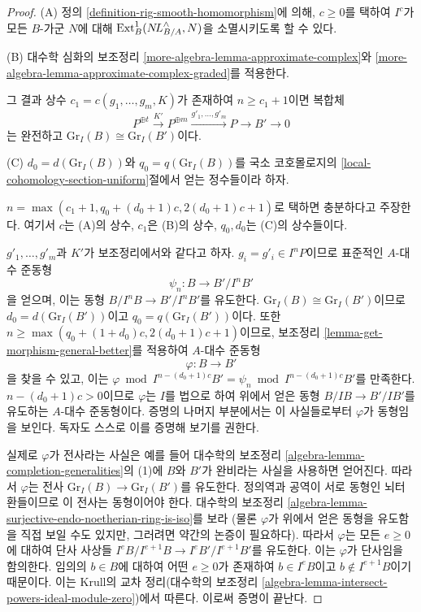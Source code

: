 \begin{proof}
(A) 정의 \ref{definition-rig-smooth-homomorphism}에 의해,
$c \geq 0$를 택하여 $I^c$가 모든 $B$-가군 $N$에 대해
$\mathop{\mathrm{Ext}}\nolimits^1_B(\mathop{N\!L}\nolimits_{B/A}^\wedge, N)$을 소멸시키도록 할 수 있다.

\medskip\noindent
(B) 대수학 심화의 보조정리
\ref{more-algebra-lemma-approximate-complex}와
\ref{more-algebra-lemma-approximate-complex-graded}를 적용한다.

\noindent
그 결과 상수 $c_1 = c(g_1, \ldots, g_m, K)$가 존재하여
$n \geq c_1 + 1$이면 복합체
$$
P^{\oplus t} \xrightarrow{K'} P^{\oplus m}
\xrightarrow{g'_1, \ldots, g'_m} P \to B' \to 0
$$
는 완전하고 $\text{Gr}_I(B) \cong \text{Gr}_I(B')$이다.

\medskip\noindent
(C) $d_0 = d(\text{Gr}_I(B))$와 $q_0 = q(\text{Gr}_I(B))$를
국소 코호몰로지의 \ref{local-cohomology-section-uniform}절에서 얻는 정수들이라 하자.

\medskip\noindent
$n = \max(c_1 + 1, q_0 + (d_0 + 1)c, 2(d_0 + 1)c + 1)$로 택하면 충분하다고 주장한다.
여기서 $c$는 (A)의 상수, $c_1$은 (B)의 상수, $q_0, d_0$는 (C)의 상수들이다.

\medskip\noindent
$g'_1, \ldots, g'_m$과 $K'$가 보조정리에서와 같다고 하자.
$g_i = g'_i \in I^nP$이므로 표준적인 $A$-대수 준동형
$$
\psi_n : B \longrightarrow B'/I^nB'
$$
을 얻으며, 이는 동형 $B/I^nB \to B'/I^nB'$를 유도한다.
$\text{Gr}_I(B) \cong \text{Gr}_I(B')$이므로
$d_0 = d(\text{Gr}_I(B'))$이고 $q_0 = q(\text{Gr}_I(B'))$이다.
또한 $n \geq \max(q_0 + (1 + d_0)c, 2(d_0 + 1)c + 1)$이므로,
보조정리 \ref{lemma-get-morphism-general-better}를 적용하여 $A$-대수 준동형
$$
\varphi : B \longrightarrow B'
$$
을 찾을 수 있고, 이는
$\varphi \bmod I^{n - (d_0 + 1)c}B' = \psi_n \bmod I^{n - (d_0 + 1)c}B'$를 만족한다.
$n - (d_0 + 1)c > 0$이므로 $\varphi$는 $I$를 법으로 하여
위에서 얻은 동형 $B/IB \to B'/IB'$를 유도하는 $A$-대수 준동형이다.
증명의 나머지 부분에서는 이 사실들로부터 $\varphi$가 동형임을 보인다.
독자도 스스로 이를 증명해 보기를 권한다.

\medskip\noindent
실제로 $\varphi$가 전사라는 사실은 예를 들어 대수학의 보조정리
\ref{algebra-lemma-completion-generalities}의 (1)에
$B$와 $B'$가 완비라는 사실을 사용하면 얻어진다.
따라서 $\varphi$는 전사 $\text{Gr}_I(B) \to \text{Gr}_I(B')$를 유도한다.
정의역과 공역이 서로 동형인 뇌터 환들이므로 이 전사는 동형이어야 한다.
대수학의 보조정리 \ref{algebra-lemma-surjective-endo-noetherian-ring-is-iso}를 보라
(물론 $\varphi$가 위에서 얻은 동형을 유도함을 직접 보일 수도 있지만,
그러려면 약간의 논증이 필요하다).
따라서 $\varphi$는 모든 $e \geq 0$에 대하여 단사 사상들
$I^eB/I^{e + 1}B \to I^eB'/I^{e + 1}B'$를 유도한다.
이는 $\varphi$가 단사임을 함의한다. 임의의 $b \in B$에 대하여
어떤 $e \geq 0$가 존재하여 $b \in I^eB$이고 $b \not \in I^{e + 1}B$이기 때문이다.
이는 Krull의 교차 정리(대수학의 보조정리
\ref{algebra-lemma-intersect-powers-ideal-module-zero})에서 따른다.
이로써 증명이 끝난다.
\end{proof}

